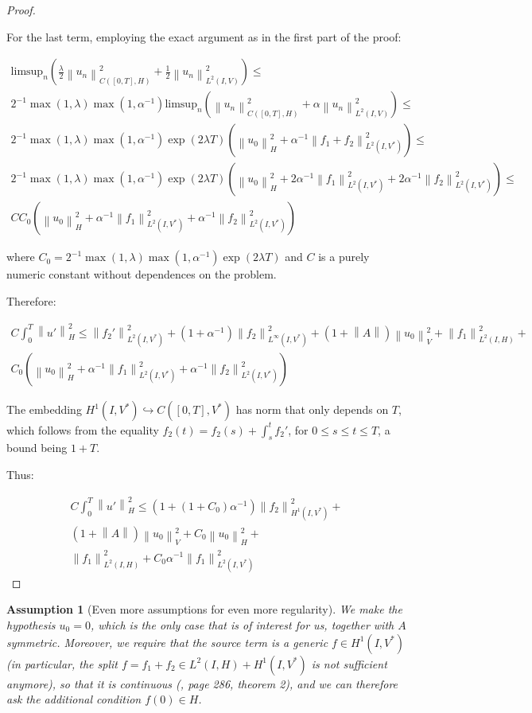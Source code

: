 \documentclass[english,a4paper,12pt,oneside]{scrbook}
\theoremstyle{break}
\newtheorem{ass}[equation]{Assumption}
\newenvironment{mproof}[1][\proofname]{%
  \begin{proof}[#1]$ $\par\nobreak\ignorespaces
}{%
  \end{proof}
}
\renewcommand*{\proofname}{Proof}
\theoremstyle{remark}
\newcommand{\ds}{\displaystyle}
\newcommand{\norm}[1]{\left\lVert#1\right\rVert}
\newcommand{\HN}[1]{\norm{#1}_{H}}
\newcommand{\VN}[1]{\norm{#1}_{V}}
\newcommand{\emb}{\hookrightarrow}
\begin{document}
\begin{mproof}
For the last term, employing the exact argument as in the first part of the proof:

\begin{align}
\label{eqn:limsup}
\text{limsup}_n \left ( \frac{\lambda}{2}\norm{u_n}_{C([0,T],H)}^2 + \frac{1}{2}\norm{u_n}_{L^2(I,V)}^2 \right )\leq\\
2^{-1}\max(1,\lambda)\max(1,\alpha^{-1}) \text{limsup}_n \left ( \norm{u_n}_{C([0,T],H)}^2 + {\alpha}\norm{u_n}_{L^2(I,V)}^2 \right )\leq\\
2^{-1}\max(1,\lambda)\max(1,\alpha^{-1})\exp(2\lambda T)(\HN{u_0}^2+\alpha^{-1}\norm{f_1+f_2}^2_{L^2(I,V^*)}) \leq \\
2^{-1}\max(1,\lambda)\max(1,\alpha^{-1})\exp(2\lambda T)(\HN{u_0}^2+2\alpha^{-1}\norm{f_1}^2_{L^2(I,V^*)}+2\alpha^{-1}\norm{f_2}^2_{L^2(I,V^*)}) \leq \\
C C_0(\HN{u_0}^2+\alpha^{-1}\norm{f_1}^2_{L^2(I,V^*)}+\alpha^{-1}\norm{f_2}^2_{L^2(I,V^*)})
\end{align}


where $C_0 = \ds 2^{-1}\max(1,\lambda)\max(1,\alpha^{-1})\exp(2\lambda T)$ and $C$ is a purely numeric constant without dependences on the problem.

Therefore:

\begin{align*}
C\int_0^T\HN{u'}^2\leq 
\norm{f_2'}_{L^2(I,V^*)}^2+(1+\alpha^{-1})\norm{f_2}_{L^\infty(I,V^*)}^2+(1+\norm{A})\VN{u_{0}}^2+\norm{f_1}_{L^2(I,H)}^2+\\
C_0(\HN{u_0}^2+\alpha^{-1}\norm{f_1}^2_{L^2(I,V^*)}+\alpha^{-1}\norm{f_2}^2_{L^2(I,V^*)})
\end{align*}


The embedding $H^1(I,V^*)\emb C([0,T],V^*)$ has norm that only depends on $T$, which follows from the equality $f_2(t)=f_2(s)+\int_s^tf_2'$, for $0\leq s \leq t \leq T$, a bound being $1+T$.

Thus:

\begin{align*}
C\int_0^T\HN{u'}^2\leq 
(1+(1+C_0)\alpha^{-1})\norm{f_2}_{H^1(I,V^*)}^2+\\
(1+\norm{A})\VN{u_{0}}^2+C_0\HN{u_0}^2+\\
\norm{f_1}_{L^2(I,H)}^2+C_0\alpha^{-1}\norm{f_1}^2_{L^2(I,V^*)}
\end{align*}


\end{mproof}

\begin{ass}[Even more assumptions for even more regularity]
\label{ass:zero_comp}
We make the hypothesis $u_0=0$, which is the only case that is of interest for us, together with $A$ symmetric. Moreover, we require that the source term is a generic $f\in H^1(I,V^*)$ (in particular, the split $f=f_1 +f_2 \in L^2(I,H)+H^1(I,V^*)$ is not sufficient anymore), so that it is continuous  (\cite{evans}, page 286, theorem 2), and we can therefore ask the additional condition $f(0) \in H$.
\end{ass}
\end{document}
